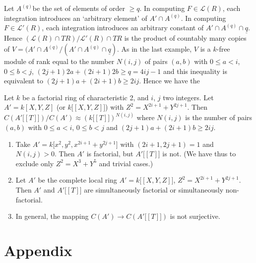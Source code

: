     \noindent
    Let $A^{(q)}$\pageoriginale be the set of elements of order $\ge
    q$. In 
    computing $F \in \mathscr{L} (R)$, each integration introduces an
    `arbitrary element' of $A' \cap A^{(q)}$. In computing $F \in
    \mathscr{L}' (R)$, each integration introduces an arbitrary
    constant of $A' \cap A^{(q)} \cap \underline{q}$. Hence
    $(\mathscr{L} (R) \cap TR) \big/ \mathscr{L}' (R) \cap TR$ is the
    product of countably many copies of $V = (A' \cap A^{(q)} \big /
    (A' \cap A^{(q)} \cap \underline{q})$. As in the last example, $V$
    is a $k$-free module of rank equal to the number $N (i, j) $ of
    pairs $(a, b)$ with $0 \le a < i$, $0 \le b < j$, $(2j + 1) 2a + (2i
    +1) 2b \ge q = 4ij - 1$ and this inequality is equivalent to $(2j
    +1) a+ (2i +1)b \ge 2ij$. Hence we have the   
    
\begin{theorem} %
Let $k$ be a factorial ring of characteristic 2, and $i$, $j$
  two integers. Let $A' = k [X, Y,Z]$ (or $k \big[[X, Y, Z]\big]$)
  with $Z^2 = X^{2i+1} + Y^{2j +1}$. Then $C(A' \big[[T]\big]) \big/
  C(A') \approx (k \big[[T]\big])^{N(i, j)}$ where  $N(i, j)$ is the
  number of pairs $(a, b)$ with $0 \le a < i$, $0 \le b < j$ and $(2 j
  +1) a+ (2i +1) b \ge 2ij$. 
\end{theorem}    
    
\begin{remarks*} %
\begin{enumerate}[(1)]
\item Take $A' = k \big[x^2, y^2, x^{2 i +1} + y^{2 j +1}\big]$ with
  $(2i +1, 2j +1)= 1$ and $N (i, j) > 0$. Then $A'$ is factorial, but  $A'
  \big[[T]\big]$ is not. (We have thus to exclude only $Z^2 = X^3 +
  Y^5$ and trivial cases.) 

\item Let $A'$ be the complete local ring $A' = k \big[[X, Y,
    Z]\big]$, $Z^2 = X^{2 i +1} + Y^{2 j +1}$. Then $A'$ and $A'
  \big[[T]\big]$ are simultaneously factorial or simultaneously 
  non-factorial. 

\item In general, the mapping $C(A') \to C(A' \big[[T]\big])$ is not
  surjective. 
\end{enumerate}
\end{remarks*}   
  
\chapter*{Appendix}\label{app}

